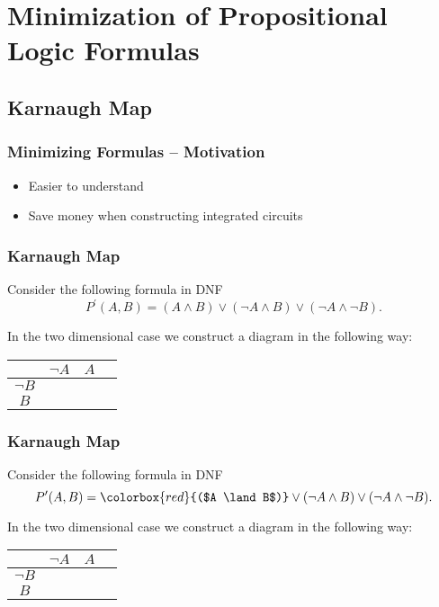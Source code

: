 \documentclass{beamer}
\theoremstyle{remark}
\begin{document}
\section{Minimization of Propositional Logic Formulas}
\subsection{Karnaugh Map}
\begin{frame}

	\frametitle{Minimizing Formulas -- Motivation}
	
	\begin{itemize}
		\item Easier to understand
		\item Save money when constructing integrated circuits
	\end{itemize}
\end{frame}

\begin{frame}
	\frametitle{Karnaugh Map}
	Consider the following formula in DNF
	\[ P^{\prime}(A, B) = (A \land B) \lor (\lnot A \land B) \lor (\lnot A \land \lnot B).\]
	
	In the two dimensional case we construct a diagram in the following way:
	
	\vspace{1.5em}
	
	\begin{center}
	\begin{tabular}{c|c|c|c}
		& $\lnot A$ & $A$ \\ \hline
		$\lnot B$ & &  \\ \hline
		$B$ & &   \\ \hline
	\end{tabular}
	\end{center}
\end{frame}

\begin{frame}
	\frametitle{Karnaugh Map}
	Consider the following formula in DNF
	\[ P^{\prime}(A, B) = \colorbox{red}{($A \land B$)} \lor (\lnot A \land B) \lor (\lnot A \land \lnot B).\]
	
	In the two dimensional case we construct a diagram in the following way:
	
	\vspace{1.5em}
	
	\begin{center}
	\begin{tabular}{c|c|c|c}
		& $\lnot A$ & $A$ \\ \hline
		$\lnot B$ & &  \\ \hline
		$B$ & &  \\ \hline
	\end{tabular}
	\end{center}
\end{frame}
\end{document}
